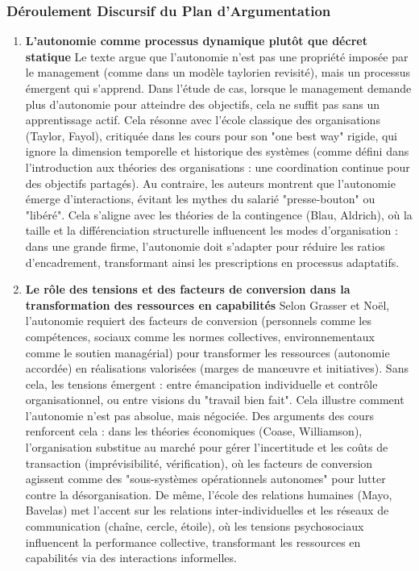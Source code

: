 \documentclass{rapportECL}
\begin{document}
\subsubsection{Déroulement Discursif du Plan d’Argumentation}
\begin{enumerate}
\item \textbf{L’autonomie comme processus dynamique plutôt que décret statique}  
Le texte argue que l’autonomie n’est pas une propriété imposée par le management (comme dans un modèle taylorien revisité), mais un processus émergent qui s’apprend. Dans l’étude de cas, lorsque le management demande plus d’autonomie pour atteindre des objectifs, cela ne suffit pas sans un apprentissage actif. Cela résonne avec l’école classique des organisations (Taylor, Fayol), critiquée dans les cours pour son "one best way" rigide, qui ignore la dimension temporelle et historique des systèmes (comme défini dans l’introduction aux théories des organisations : une coordination continue pour des objectifs partagés). Au contraire, les auteurs montrent que l’autonomie émerge d’interactions, évitant les mythes du salarié "presse-bouton" ou "libéré". Cela s’aligne avec les théories de la contingence (Blau, Aldrich), où la taille et la différenciation structurelle influencent les modes d’organisation : dans une grande firme, l’autonomie doit s’adapter pour réduire les ratios d’encadrement, transformant ainsi les prescriptions en processus adaptatifs.

\item \textbf{Le rôle des tensions et des facteurs de conversion dans la transformation des ressources en capabilités}  
Selon Grasser et Noël, l’autonomie requiert des facteurs de conversion (personnels comme les compétences, sociaux comme les normes collectives, environnementaux comme le soutien managérial) pour transformer les ressources (autonomie accordée) en réalisations valorisées (marges de manœuvre et initiatives). Sans cela, les tensions émergent : entre émancipation individuelle et contrôle organisationnel, ou entre visions du "travail bien fait". Cela illustre comment l’autonomie n’est pas absolue, mais négociée. Des arguments des cours renforcent cela : dans les théories économiques (Coase, Williamson), l’organisation substitue au marché pour gérer l’incertitude et les coûts de transaction (imprévisibilité, vérification), où les facteurs de conversion agissent comme des "sous-systèmes opérationnels autonomes" pour lutter contre la désorganisation. De même, l’école des relations humaines (Mayo, Bavelas) met l’accent sur les relations inter-individuelles et les réseaux de communication (chaîne, cercle, étoile), où les tensions psychosociaux influencent la performance collective, transformant les ressources en capabilités via des interactions informelles.


\end{enumerate}
\end{document}
